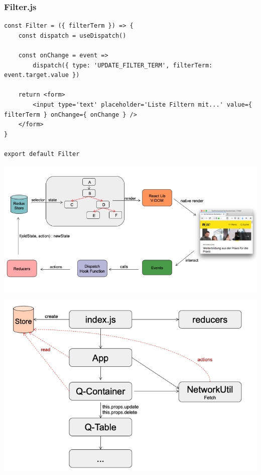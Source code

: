 \subsubsection{Filter.js}

\begin{verbatim}
const Filter = ({ filterTerm }) => {
    const dispatch = useDispatch()

    const onChange = event =>
        dispatch({ type: 'UPDATE_FILTER_TERM', filterTerm: event.target.value })

    return <form>
        <input type='text' placeholder='Liste Filtern mit...' value={ filterTerm } onChange={ onChange } />
    </form>
}

export default Filter
\end{verbatim}

\includegraphics[width=\columnwidth]{images/reduxflow}

\includegraphics[width=\columnwidth]{images/flashcardredux}

